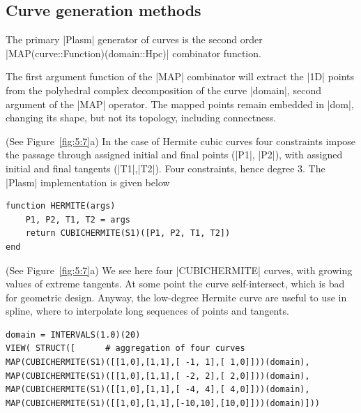 \begin{coding}[Algebraic computation of FE = $\delta_1$]
{\subsection{ Curve generation methods}\label{sect:5-4-1}

The primary |Plasm| generator of curves is the second order |MAP(curve::Function)(domain::Hpc)| combinator function. 

\begin{remark}
The first argument function of the |MAP| combinator will extract the |1D| points from the polyhedral complex decomposition of the curve |domain|, second argument of the |MAP| operator. The mapped points remain embedded in |dom|, changing its shape, but not its topology, including connectness.
\end{remark}


\begin{condition} (See Figure~\ref{fig:5:7}a)
In the case of Hermite cubic curves four constraints impose the passage through assigned initial and final points (|P1|, |P2|), with assigned initial and final tangents (|T1|,|T2|). Four constraints, hence degree 3. The |Plasm| implementation is given below
\begin{lstlisting}[language=JuliaLocal, style=julia, mathescape=true]
function HERMITE(args)
	P1, P2, T1, T2 = args
	return CUBICHERMITE(S1)([P1, P2, T1, T2])
end
\end{lstlisting}
\end{condition}

\begin{condition}\label{ex:5:4:2} (See Figure~\ref{fig:5:7}a)
We see here four |CUBICHERMITE| curves, with growing values of extreme tangents. At some point the curve self-intersect, which is bad for geometric design. Anyway, the low-degree Hermite curve are useful to use in spline, where to interpolate long sequences of points and tangents.
\begin{lstlisting}[language=JuliaLocal, style=julia, mathescape=true]
domain = INTERVALS(1.0)(20)
VIEW( STRUCT([		# aggregation of four curves
MAP(CUBICHERMITE(S1)([[1,0],[1,1],[ -1, 1],[ 1,0]]))(domain),
MAP(CUBICHERMITE(S1)([[1,0],[1,1],[ -2, 2],[ 2,0]]))(domain),
MAP(CUBICHERMITE(S1)([[1,0],[1,1],[ -4, 4],[ 4,0]]))(domain),
MAP(CUBICHERMITE(S1)([[1,0],[1,1],[-10,10],[10,0]]))(domain)]))
\end{lstlisting}
\end{condition}

}
\end{coding}
